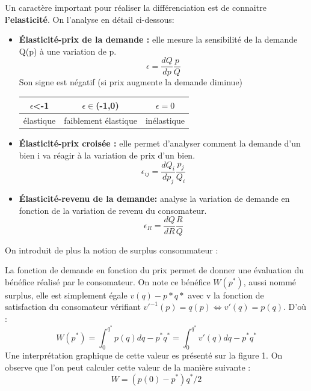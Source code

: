 Un caractère important pour réaliser la différenciation est de connaitre \textbf{l'elasticité}. On l'analyse en détail ci-dessous:

\begin{tcolorbox}[title=Élasticités]
	\begin{itemize}[label=]
		\item \textbf{Élasticité-prix de la demande :} elle mesure la sensibilité de la demande Q(p) à une variation de p. 
		\[
			\epsilon = \frac{dQ}{dp}\frac{p}{Q}
		\]
		Son signe est négatif (si prix augmente la demande diminue)
		\begin{tabular}{|c|c|c|}
		\hline
		$\epsilon$<-1 & $\epsilon \in$(-1,0) & $\epsilon =0$ \\
		\hline 
		élastique & faiblement élastique & inélastique \\
		\hline
		\end{tabular}
	
	
	
		\item \textbf{Élasticité-prix croisée :} elle permet d'analyser comment la demande d'un bien i va réagir à la variation de prix d'un bien.
		\[
			\epsilon_{ij} = \frac{dQ_i}{dp_j}\frac{p_j}{Q_i}
		\]
		\item \textbf{Élasticité-revenu de la demande:} analyse la variation de demande en fonction de la variation de revenu du consomateur.
		\[
			\epsilon_R = \frac{dQ}{dR}\frac{R}{Q}
		\]
	\end{itemize}
\end{tcolorbox}

On introduit de plus la notion de surplus consommateur : 
\begin{tcolorbox}[title=Surplus consommateur]
	La fonction de demande en fonction du prix permet de donner une évaluation du bénéfice réalisé par le consomateur. On note ce bénéfice $W(p^*)$, aussi nommé surplus, elle est simplement égale $v(q)-p*q*$ avec v la fonction de satisfaction du consomateur vérifiant $v'^{-1}(p)=q(p) \Leftrightarrow v'(q)=p(q)$. D'où :
	\[
		W(p^*)= \int_0^{q^*}p(q)dq - p^*q^* = \int_0^{q^*}v'(q)dq - p^*q^*
	\]
Une interprétation graphique de cette valeur es présenté sur la figure 1. On observe que l'on peut calculer cette valeur de la manière suivante :
\[
	W=(p(0)-p^*)q^*/2
\]

\end{tcolorbox}

